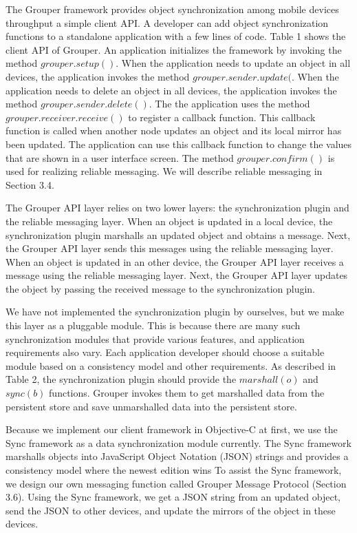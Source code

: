 \documentclass[twocolumn,10pt]{article}
\begin{document}
The Grouper framework provides object synchronization among mobile devices throughput a simple client API.
A developer can add object synchronization functions to a standalone application with a few lines of code.
Table 1 shows the client API of Grouper.
An application initializes the framework by invoking the method $grouper.setup()$.
When the application needs to update an object in all devices, the application invokes the method $grouper.sender.update($.
When the application needs to delete an object in all devices, the application invokes the method $grouper.sender.delete()$.
The the application uses the method $grouper.receiver.receive()$ to register a callback function.
This callback function is called when another node updates an object and its local mirror has been updated.
The application can use this callback function to change the values that are shown in a user interface screen.
The method $grouper.confirm()$ is used for realizing reliable messaging.
We will describe reliable messaging in Section 3.4.

The Grouper API layer relies on two lower layers: the synchronization plugin and the reliable messaging layer.
When an object is updated in a local device, the synchronization plugin marshalls an updated object and obtains a message.
Next, the Grouper API layer sends this messages using the reliable messaging layer.
When an object is updated in an other device, the Grouper API layer receives a message using the reliable messaging layer.
Next, the Grouper API layer updates the object by passing the received message to the synchronization plugin.

We have not implemented the synchronization plugin by ourselves, but we make this layer as a pluggable module.
This is because there are many such synchronization modules that provide various features, and application requirements also vary.
Each application developer should choose a suitable module based on a consistency model and other requirements.
As described in Table 2, the synchronization plugin should provide the $marshall(o)$ and $sync(b)$ functions.
Grouper invokes them to get marshalled data from the persistent store and save unmarshalled data into the persistent store.

Because we implement our client framework in Objective-C at first, we use the Sync framework\cite{sync} as a data synchronization module currently.
The Sync framework marshalls objects into JavaScript Object Notation (JSON) strings and provides a consistency model where the newest edition wins
To assist the Sync framework, we design our own messaging function called Grouper Message Protocol (Section 3.6). 
Using the Sync framework, we get a JSON string from an updated object, send the JSON to other devices, and update the mirrors of the object in these devices.
\end{document}
